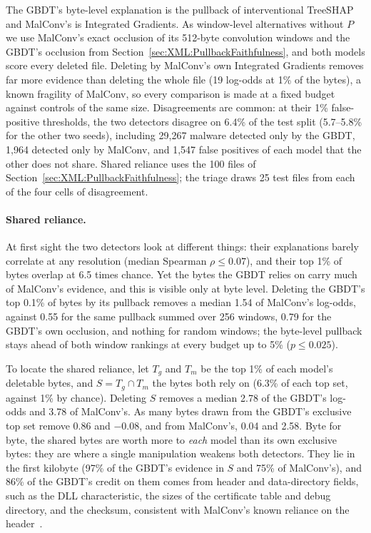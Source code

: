 The GBDT's byte-level explanation is the pullback of interventional TreeSHAP and MalConv's is Integrated Gradients.
As window-level alternatives without $P$ we use MalConv's exact occlusion of its 512-byte convolution windows and the
GBDT's occlusion from Section~\ref{sec:XML:PullbackFaithfulness}, and both models score every deleted file. Deleting
by MalConv's own Integrated Gradients removes far more evidence than deleting the whole file (19 log-odds at 1\% of the
bytes), a known fragility of MalConv, so every comparison is made at a fixed budget against controls of the same size.
Disagreements are common: at their 1\% false-positive thresholds, the two detectors disagree on 6.4\% of the test split
(5.7--5.8\% for the other two seeds), including 29{,}267 malware detected only by the GBDT, 1{,}964 detected only by
MalConv, and 1{,}547 false positives of each model that the other does not share. Shared reliance uses the 100 files of
Section~\ref{sec:XML:PullbackFaithfulness}; the triage draws 25 test files from each of the four cells of
disagreement.

\paragraph{Shared reliance.} At first sight the two detectors look at different things: their explanations barely
correlate at any resolution (median Spearman $\rho \leq 0.07$), and their top 1\% of bytes overlap at 6.5 times
chance. Yet the bytes the GBDT relies on carry much of MalConv's evidence, and this is visible only at byte level.
Deleting the GBDT's top 0.1\% of bytes by its pullback removes a median 1.54 of MalConv's log-odds, against 0.55 for
the same pullback summed over 256 windows, 0.79 for the GBDT's own occlusion, and nothing for random windows; the
byte-level pullback stays ahead of both window rankings at every budget up to 5\% ($p \leq 0.025$).

To locate the shared reliance, let $T_g$ and $T_m$ be the top 1\% of each model's deletable bytes, and
$S = T_g \cap T_m$ the bytes both rely on (6.3\% of each top set, against 1\% by chance). Deleting $S$ removes a median
2.78 of the GBDT's log-odds and 3.78 of MalConv's. As many bytes drawn from the GBDT's exclusive top set remove 0.86
and $-0.08$, and from MalConv's, 0.04 and 2.58. Byte for byte, the shared bytes are worth more to \emph{each} model
than its own exclusive bytes: they are where a single manipulation weakens both detectors. They lie in the first
kilobyte (97\% of the GBDT's evidence in $S$ and 75\% of MalConv's), and 86\% of the GBDT's credit on them comes from
header and data-directory fields, such as the DLL characteristic, the sizes of the certificate table and debug
directory, and the checksum, consistent with MalConv's known reliance on the header~\cite{demetrio2019explaining}.

